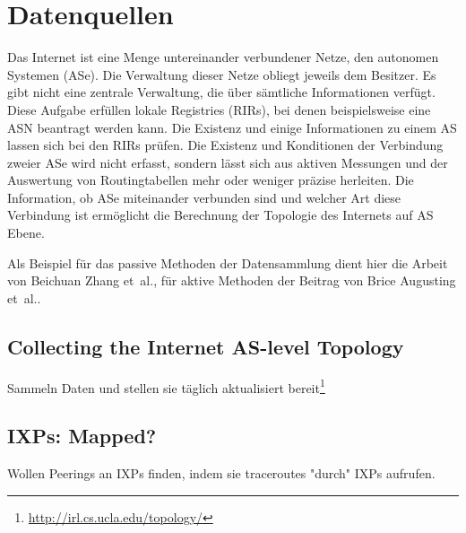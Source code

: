 \section{Datenquellen}\label{sec:datenquellen}

Das Internet ist eine Menge untereinander verbundener Netze, den autonomen
Systemen (ASe). Die Verwaltung dieser Netze obliegt jeweils dem Besitzer. Es
gibt nicht eine zentrale Verwaltung, die über sämtliche Informationen verfügt.
Diese Aufgabe erfüllen lokale Registries (RIRs), bei denen beispielsweise eine
ASN beantragt werden kann. Die Existenz und einige Informationen zu einem AS
lassen sich bei den RIRs prüfen. Die Existenz und Konditionen der Verbindung
zweier ASe wird nicht erfasst, sondern lässt sich aus aktiven Messungen und der
Auswertung von Routingtabellen mehr oder weniger präzise herleiten. Die
Information, ob ASe miteinander verbunden sind und welcher Art diese Verbindung
ist ermöglicht die Berechnung der Topologie des Internets auf AS Ebene.

Als Beispiel für das passive Methoden der Datensammlung dient hier die Arbeit
von Beichuan Zhang et\ al., für aktive Methoden der Beitrag von Brice Augusting
et\ al..

\subsection{Collecting the Internet AS-level Topology~\cite{Zhang:2005:CIA:1052812.1052825}}

Sammeln Daten und stellen sie täglich aktualisiert bereit\footnote{\url{http://irl.cs.ucla.edu/topology/}}


\subsection{IXPs: Mapped?~\cite{Augustin:2009:IM:1644893.1644934}}

Wollen Peerings an IXPs finden, indem sie traceroutes "durch" IXPs aufrufen.
